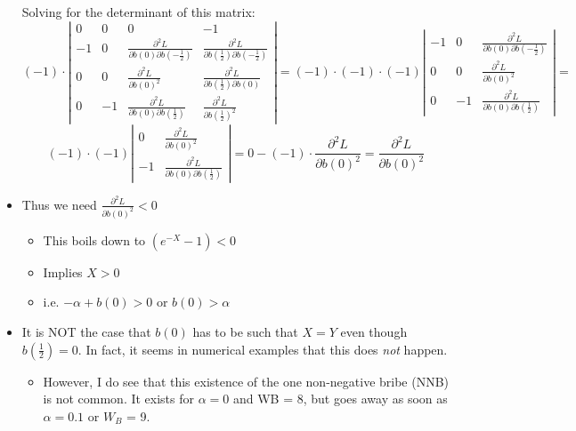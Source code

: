 \documentclass[12pt]{article}
\newcommand{\al}{\alpha}
\begin{document}
\begin{itemize}
		
		Solving for the determinant of this matrix:
		\[
		  (-1)\cdot 
			\left|\begin{array}{cccc}
				0 & 0 & 0 & -1\\
				- 1 & 0 & \frac{\partial^2 L}{\partial b(0)\partial b\left(-\frac{1}{2}\right)} & \frac{\partial^2 L}{\partial b\left(\frac{1}{2}\right)\partial b\left(-\frac{1}{2}\right)}  \\
			0 & 0 & \frac{\partial^2 L}{\partial b(0)^2} & \frac{\partial^2 L}{\partial b\left(\frac{1}{2}\right)\partial b\left(0\right)} \\
			0 & -1 & \frac{\partial^2 L}{\partial b(0) \partial b\left(\frac{1}{2}\right)} & \frac{\partial^2 L}{\partial b\left(\frac{1}{2}\right)^2}
			\end{array} \right|
		=
						  (-1)\cdot (-1) \cdot (-1)
			\left|\begin{array}{ccc}
				- 1 & 0 & \frac{\partial^2 L}{\partial b(0)\partial b\left(-\frac{1}{2}\right)}  \\
			0 & 0 & \frac{\partial^2 L}{\partial b(0)^2}\\
			0 & -1 & \frac{\partial^2 L}{\partial b(0) \partial b\left(\frac{1}{2}\right)}
			\end{array} \right| =
		\]
		\[
		  (-1) \cdot (-1)
			\left|\begin{array}{cc}	
			0 & \frac{\partial^2 L}{\partial b(0)^2}\\
			-1 & \frac{\partial^2 L}{\partial b(0) \partial b\left(\frac{1}{2}\right)}
			\end{array} \right| = 0 - (-1) \cdot \frac{\partial^2 L}{\partial b(0)^2} = \frac{\partial^2 L}{\partial b(0)^2}
		\]
		\item Thus we need $\frac{\partial^2 L}{\partial b(0)^2} < 0$
			\begin{itemize}
				\item This boils down to $\left(e^{-X} - 1\right) < 0$
				\item Implies $X > 0$
				\item i.e. $-\al + b(0) > 0$ or $b(0) > \al$
			\end{itemize}
		\item It is NOT the case that $b(0)$ has to be such that $X=Y$ even though $b\left(\frac{1}{2}\right) =0$. In fact, it seems in numerical examples that this does \textit{not} happen.
			\begin{itemize}
				\item However, I do see that this existence of the one non-negative bribe (NNB) is not common. It exists for $\al = 0$ and WB = 8, but goes away as soon as $\al = 0.1$ or $W_B$ = 9.

\end{itemize}
\end{itemize}
\end{document}
